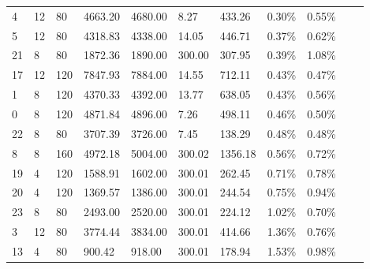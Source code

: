 \documentclass[../main]{subfiles}
\begin{document}
\begin{longtable}{l|ll|lll|lllll}
   4                   & 12                         & 80                         & 4663.20                   & 4680.00  & 8.27                & 433.26  & 0.30\%  & 0.55\% \\
   5                   & 12                         & 80                         & 4318.83                   & 4338.00  & 14.05               & 446.71  & 0.37\%  & 0.62\% \\
   21                  & 8                          & 80                         & 1872.36                   & 1890.00  & 300.00              & 307.95  & 0.39\%  & 1.08\% \\
   17                  & 12                         & 120                        & 7847.93                   & 7884.00  & 14.55               & 712.11  & 0.43\%  & 0.47\% \\
   1                   & 8                          & 120                        & 4370.33                   & 4392.00  & 13.77               & 638.05  & 0.43\%  & 0.56\% \\
   0                   & 8                          & 120                        & 4871.84                   & 4896.00  & 7.26                & 498.11  & 0.46\%  & 0.50\% \\
   22                  & 8                          & 80                         & 3707.39                   & 3726.00  & 7.45                & 138.29  & 0.48\%  & 0.48\% \\
   8                   & 8                          & 160                        & 4972.18                   & 5004.00  & 300.02              & 1356.18 & 0.56\%  & 0.72\% \\
   19                  & 4                          & 120                        & 1588.91                   & 1602.00  & 300.01              & 262.45  & 0.71\%  & 0.78\% \\
   20                  & 4                          & 120                        & 1369.57                   & 1386.00  & 300.01              & 244.54  & 0.75\%  & 0.94\% \\
   23                  & 8                          & 80                         & 2493.00                   & 2520.00  & 300.01              & 224.12  & 1.02\%  & 0.70\% \\
   3                   & 12                         & 80                         & 3774.44                   & 3834.00  & 300.01              & 414.66  & 1.36\%  & 0.76\% \\
   13                  & 4                          & 80                         & 900.42                    & 918.00   & 300.01              & 178.94  & 1.53\%  & 0.98\% \\

\end{longtable}
\end{document}
